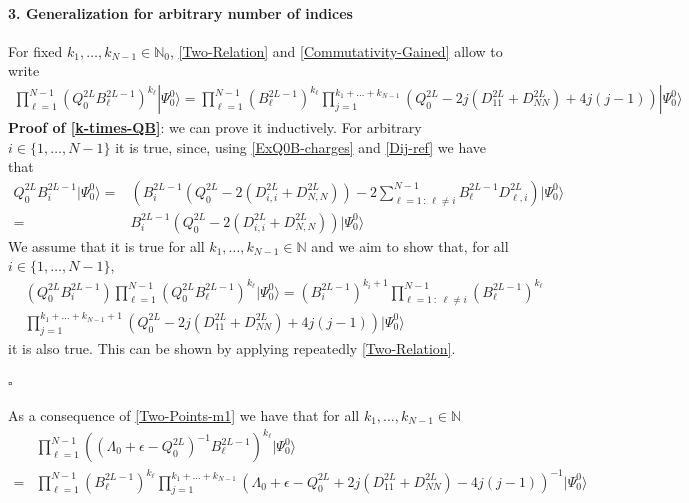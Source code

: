 \documentclass[10pt]{article}
\numberwithin{equation}{section}
\numberwithin{equation}{subsection}
\begin{document}
\paragraph{3. Generalization for arbitrary number of indices} For fixed $k_{1},\ldots,k_{N-1}\in \mathbb{N}_{0}$, \eqref{Two-Relation} and \eqref{Commutativity-Gained} allow to write 
\begin{equation}\label{k-times-QB}
	\begin{split}
		\prod_{\ell=1}^{N-1}\left(Q_{0}^{2L}B_{\ell}^{2L-1}\right)^{k_{\ell}}|\Psi_{0}^{0}\rangle=\prod_{\ell=1}^{N-1}\left(B_{\ell}^{2L-1}\right)^{k_{\ell}}\prod_{j=1}^{k_{1}+\ldots+k_{N-1}}\left(Q_{0}^{2L}-2j(D_{11}^{2L}+D_{NN}^{2L})+4j(j-1)\right)|\Psi_{0}^{0}\rangle
	\end{split}
\end{equation}
\textbf{Proof of \eqref{k-times-QB}}: we can prove it inductively. For arbitrary $i\in\{1,\ldots,N-1\}$ it is true, since, using \eqref{ExQ0B-charges} and \eqref{Dij-ref} we have that 
\begin{align}
	Q_{0}^{2L}B_{i}^{2L-1}|\Psi_{0}^{0}\rangle=&\left(B_{i}^{2L-1}\left(Q_{0}^{2L}-2(D_{i,i}^{2L}+D_{N,N}^{2L})\right)-2\sum_{\ell=1\,:\,\ell\neq i}^{N-1}B_{\ell}^{2L-1}D_{\ell,i}^{2L}\right)|\Psi_{0}^{0}\rangle\nonumber\\=&B_{i}^{2L-1}\left(Q_{0}^{2L}-2(D_{i,i}^{2L}+D_{N,N}^{2L})\right)|\Psi_{0}^{0}\rangle
\end{align}
We assume that it is true for all $k_{1},\ldots,k_{N-1}\in\mathbb{N}$ and we aim to show that, for all $i\in\{1,\ldots,N-1\}$,  
\begin{align}
&\left(Q_{0}^{2L}B_{i}^{2L-1}\right)\prod_{\ell=1}^{N-1}\left(Q_{0}^{2L}B_{\ell}^{2L-1}\right)^{k_{\ell}}|\Psi_{0}^{0}\rangle=\left(B_{i}^{2L-1}\right)^{k_{i}+1}\prod_{\ell=1\,:\;\ell\neq i}^{N-1}\left(B_{\ell}^{2L-1}\right)^{k_{\ell}}\nonumber\\&\prod_{j=1}^{k_{1}+\ldots+k_{N-1}+1}\left(Q_{0}^{2L}-2j(D_{11}^{2L}+D_{NN}^{2L})+4j(j-1)\right)|\Psi_{0}^{0}\rangle
\end{align}
it is also true. This can be shown by applying repeatedly \eqref{Two-Relation}.
\begin{flushright}
	$\square$
\end{flushright}
As a consequence of \eqref{Two-Points-m1} we have that for all  $k_{1},\ldots,k_{N-1}\in\mathbb{N}$
\begin{equation}\label{k-times-LQB}
	\begin{split}
		&\prod_{\ell=1}^{N-1}\left((\Lambda_{0}+\epsilon-Q_{0}^{2L})^{-1}B_{\ell}^{2L-1}\right)^{k_{\ell}}|\Psi_{0}^{0}\rangle\\=&\prod_{\ell=1}^{N-1}\left(B_{\ell}^{2L-1}\right)^{k_{\ell}}\prod_{j=1}^{k_{1}+\ldots+k_{N-1}}\left(\Lambda_{0}+\epsilon-Q_{0}^{2L}+2j(D_{11}^{2L}+D_{NN}^{2L})-4j(j-1)\right)^{-1}|\Psi_{0}^{0}\rangle
	\end{split}
\end{equation}
\end{document}
